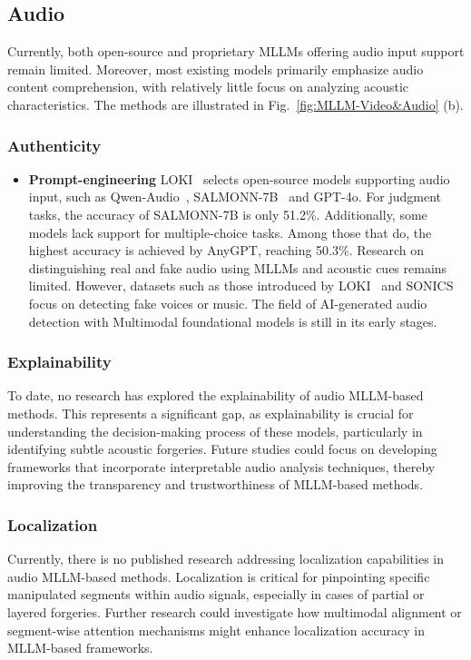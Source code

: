     \subsection{Audio}
    Currently, both open-source and proprietary MLLMs offering audio input support remain limited. Moreover, most existing models primarily emphasize audio content comprehension, with relatively little focus on analyzing acoustic characteristics. The methods are illustrated in Fig.~\ref{fig:MLLM-Video&Audio} (b).
    \subsubsection{\textbf{Authenticity}}
    
    \begin{itemize}
    \item \textbf{Prompt-engineering}
    LOKI~\cite{ye2024loki} selects open-source models supporting audio input, such as Qwen-Audio~\cite{chu2023qwen}, SALMONN-7B~\cite{sun2024video} and GPT-4o. For judgment tasks, the accuracy of SALMONN-7B is only 51.2\%. Additionally, some models lack support for multiple-choice tasks. Among those that do, the highest accuracy is achieved by AnyGPT, reaching 50.3\%. Research on distinguishing real and fake audio using MLLMs and acoustic cues remains limited. However, datasets such as those introduced by LOKI~\cite{ye2024loki} and SONICS~\cite{rahman2024sonics} focus on detecting fake voices or music. The field of AI-generated audio detection with Multimodal foundational models is still in its early stages.
    \end{itemize}
    
    \subsubsection{\textbf{Explainability}}
    To date, no research has explored the explainability of audio MLLM-based methods. This represents a significant gap, as explainability is crucial for understanding the decision-making process of these models, particularly in identifying subtle acoustic forgeries. Future studies could focus on developing frameworks that incorporate interpretable audio analysis techniques, thereby improving the transparency and trustworthiness of MLLM-based methods.

    \subsubsection{\textbf{Localization}}
    Currently, there is no published research addressing localization capabilities in audio MLLM-based methods. Localization is critical for pinpointing specific manipulated segments within audio signals, especially in cases of partial or layered forgeries. Further research could investigate how multimodal alignment or segment-wise attention mechanisms might enhance localization accuracy in MLLM-based frameworks.

